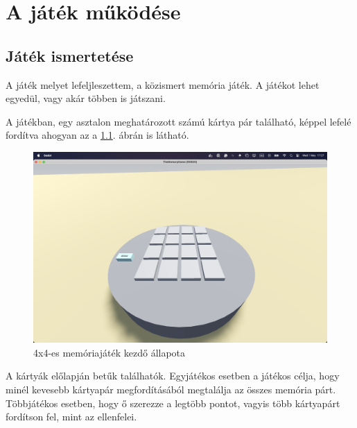 \chapter{A játék működése}

\thispagestyle{fancy}
\pagestyle{fancy}
\section{Játék ismertetése}

A játék melyet lefeljleszettem, a közismert memória játék. A játékot lehet egyedül, vagy akár többen is játszani.

A játékban, egy asztalon meghatározott számú kártya pár található, képpel lefelé fordítva ahogyan az a \ref{img:asztal}. ábrán is látható.
\begin{figure}[h]
    \includegraphics[width=\textwidth]{img/asztal_4x4.png}
    \caption{4x4-es memóriajáték kezdő állapota}
    \label{img:asztal}
\end{figure}
A kártyák előlapján betűk találhatók. Egyjátékos esetben a játékos célja, hogy minél kevesebb kártyapár megfordításából megtalálja az összes memória párt. Többjátékos esetben, hogy ő szerezze a legtöbb pontot, vagyis több kártyapárt fordítson fel, mint az ellenfelei.


